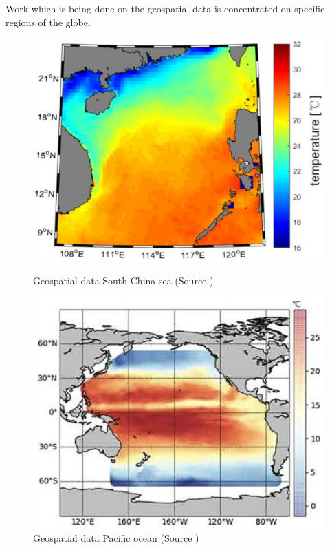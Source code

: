 Work which is being done on the geospatial data is concentrated on specific regions of the globe.
\begin{figure}[h]
    \centering
    \begin{minipage}{0.45\textwidth}
        \centering
        \includegraphics[width=0.9\linewidth]{figures/chapter-1/jmse-11-01030-g001.png}
        \caption{Geospatial data South China sea (Source \cite{jmse11051030})}
        \label{fig:geo-spatial-data-south-china-sea}
    \end{minipage}\hfill
    \begin{minipage}{0.45\textwidth}
        \centering
        \includegraphics[width=0.9\linewidth]{figures/chapter-1/pacific_ocean.png}
        \caption{Geospatial data Pacific ocean (Source \cite{8913542})}
        \label{fig:geo-spatial-data-pacific-ocean}
    \end{minipage}\hfill
\end{figure}

